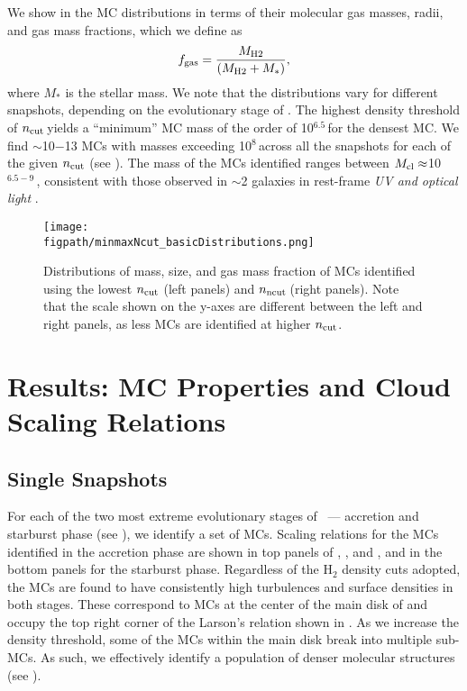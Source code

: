 \IfFileExists{emulateapjlegacy.cls}{\documentclass[iop]{emulateapjlegacy}}{\documentclass[iop]{emulateapj}}
\newcommand{\AP}[1]{({\bf \color{apcolor} AP: #1})}
\begin{document}
We show in  the MC distributions in terms of their
molecular gas masses, radii, and gas mass fractions, which we define as
\begin{equation}
f_{\rm gas} = \frac{M_{\rm H2}} {\left(M_{\rm H2} + M_*\right)},
\end{equation}
where $M_*$ is the stellar mass.
We note that the distributions vary for different snapshots, depending on the evolutionary stage of \flower.
The highest density threshold of $n_{\rm cut}$\,\cc yields a ``minimum'' MC mass of
the order of 10$^{6.5}$\,\Msun for the densest MC.
We find $\sim$10$-$13 MCs with masses exceeding 10$^8$\,\Msun across all the
snapshots for each of the given $n_{\rm cut}$ (see ).
The mass of the MCs identified ranges between $M_{\rm cl}\approx$10$^{6.5-9}$\,\Msun, 
consistent with those observed in \z$\sim$2 galaxies in
rest-frame {\it UV and optical light} \citep{Elmegreen07a, Elmegreen09a}.

\begin{figure*}[htbp]
\centering
\texttt{[image: \\figpath/minmaxNcut\_basicDistributions.png]}
\caption{
Distributions of mass, size, and gas mass fraction of MCs identified using
the lowest $n_{\rm cut}$ (left panels) and $n_{\rm ncut}$\,\cc (right panels).
Note that the scale shown on the y-axes are different between the left and right panels, as less MCs are identified
at higher $n_{\rm cut}$.
\label{fig:dist}}
\end{figure*}



\section{Results: MC Properties and Cloud Scaling Relations}    \label{sec:results}
\subsection{Single Snapshots}  \label{sec:singless}

For each of the two most extreme evolutionary stages of \flower\ --- accretion and starburst phase (see ),
we identify a set of MCs. 
Scaling relations for the MCs identified in the accretion phase are shown in top panels 
of , , and , and in the bottom panels for the starburst phase.
Regardless of the H$_2$ density cuts adopted,
the MCs are found to have consistently high turbulences and surface densities in both stages.
These correspond to MCs at the center of the main disk of \flower and
occupy the top right corner of the Larson's relation shown in .
As we increase the density threshold, some of the MCs within the main disk break
into multiple sub-MCs.
As such, we effectively identify a population of denser molecular structures (see ).
\end{document}
